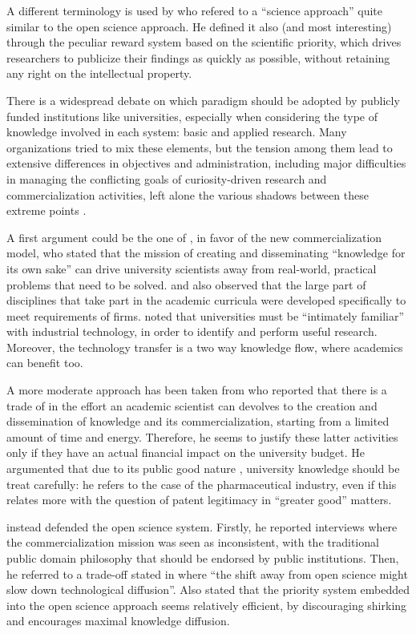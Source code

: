 A different terminology is used by \citet{Stern2004} who refered to a \enquote{science approach} quite similar to the open science approach. He defined it also (and most interesting) through the peculiar reward system based on the scientific priority, which drives researchers to publicize their findings as quickly as possible, without retaining any right on the intellectual property. 

There is a widespread debate on which paradigm should be adopted by publicly funded institutions like universities, especially when considering the type of knowledge involved in each system: basic and applied research. Many organizations tried to mix these elements, but the tension among them lead to extensive differences in objectives and administration, including major difficulties in managing the conflicting goals of curiosity-driven research and commercialization activities, left alone the various shadows between these extreme points \citep{Rasmussen2006}.

A first argument could be the one of \citet{Geuna2009}, in favor of the new commercialization model, who stated that the mission of creating and disseminating \enquote{knowledge for its own sake} can drive university scientists away from real-world, practical problems that need to be solved. \citet{Rosenberg1994} and \citet{Nelson1998} also observed that the large part of disciplines that take part in the academic curricula were developed specifically to meet requirements of firms. \citet{Balconi2006} noted that universities must be \enquote{intimately familiar} with industrial technology, in order to identify and perform useful research. Moreover, the technology transfer is a two way knowledge flow, where academics can benefit too.

A more moderate approach has been taken from \citet{Beath2000} who reported that there is a trade of in the effort an academic scientist can devolves to the creation and dissemination of knowledge and its commercialization, starting from a limited amount of time and energy. Therefore, he seems to justify these latter activities only if they have an actual financial impact on the university budget. He argumented that due to its public good nature \citep{Muscio2013}, university knowledge should be treat carefully: he refers to the case of the pharmaceutical industry, even if this relates more with the question of patent legitimacy in \enquote{greater good} matters.

\citet{Siegel2003a} instead defended the open science system. Firstly, he reported interviews where the commercialization mission was seen as inconsistent, with the traditional public domain philosophy that should be endorsed by public institutions. Then, he referred to a trade-off stated in \citet{Nelson2001} where \enquote{the shift away from open science might slow down technological diffusion}. Also \citet{Stern2004} stated that the priority system embedded into the open science approach seems relatively efficient, by discouraging shirking and encourages maximal knowledge diffusion.

